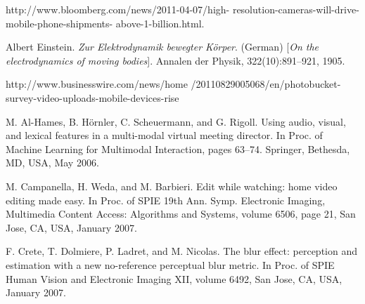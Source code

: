 \documentclass{sig-alternate}
\begin{document}
\begin{thebibliography}{9}
http://www.bloomberg.com/news/2011-04-07/high-
resolution-cameras-will-drive-mobile-phone-shipments-
above-1-billion.html.
 
Albert Einstein. 
\textit{Zur Elektrodynamik bewegter K{\"o}rper}. (German) 
[\textit{On the electrodynamics of moving bodies}]. 
Annalen der Physik, 322(10):891–921, 1905.
 
http://www.businesswire.com/news/home
/20110829005068/en/photobucket-survey-video-uploads-mobile-devices-rise


M. Al-Hames, B. Hörnler, C. Scheuermann, and G. Rigoll.
Using audio, visual, and lexical features in a multi-modal
virtual meeting director. In Proc. of Machine Learning for
Multimodal Interaction, pages 63–74. Springer, Bethesda,
MD, USA, May 2006.


M. Campanella, H. Weda, and M. Barbieri. Edit while
watching: home video editing made easy. In Proc. of SPIE
19th Ann. Symp. Electronic Imaging, Multimedia Content
Access: Algorithms and Systems, volume 6506, page 21, San
Jose, CA, USA, January 2007.

F. Crete, T. Dolmiere, P. Ladret, and M. Nicolas. The blur
effect: perception and estimation with a new no-reference
perceptual blur metric. In Proc. of SPIE Human Vision and
Electronic Imaging XII, volume 6492, San Jose, CA, USA,
January 2007.

\end{thebibliography}
\end{document}
